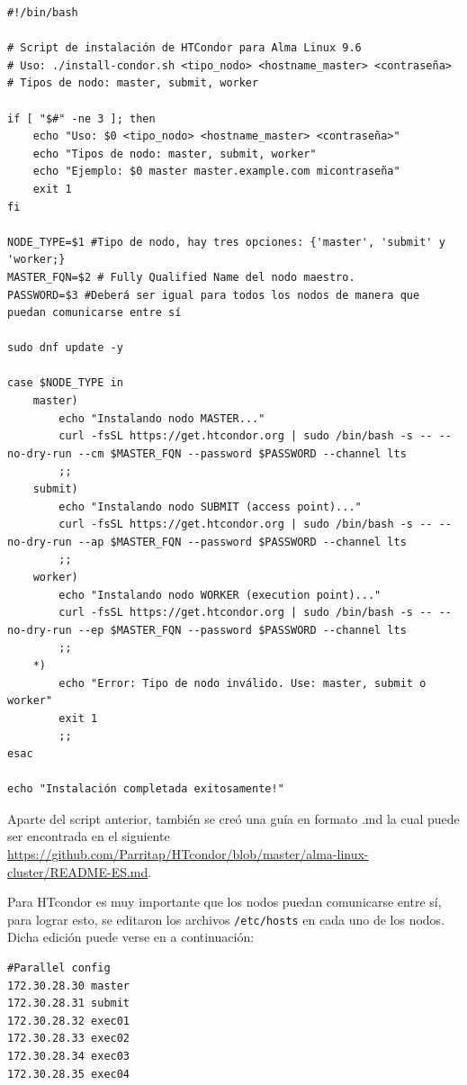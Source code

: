 \begin{verbatim}
#!/bin/bash

# Script de instalación de HTCondor para Alma Linux 9.6
# Uso: ./install-condor.sh <tipo_nodo> <hostname_master> <contraseña>
# Tipos de nodo: master, submit, worker

if [ "$#" -ne 3 ]; then
    echo "Uso: $0 <tipo_nodo> <hostname_master> <contraseña>"
    echo "Tipos de nodo: master, submit, worker"
    echo "Ejemplo: $0 master master.example.com micontraseña"
    exit 1
fi

NODE_TYPE=$1 #Tipo de nodo, hay tres opciones: {'master', 'submit' y 'worker;}
MASTER_FQN=$2 # Fully Qualified Name del nodo maestro.
PASSWORD=$3 #Deberá ser igual para todos los nodos de manera que puedan comunicarse entre sí

sudo dnf update -y

case $NODE_TYPE in
    master)
        echo "Instalando nodo MASTER..."
        curl -fsSL https://get.htcondor.org | sudo /bin/bash -s -- --no-dry-run --cm $MASTER_FQN --password $PASSWORD --channel lts
        ;;
    submit)
        echo "Instalando nodo SUBMIT (access point)..."
        curl -fsSL https://get.htcondor.org | sudo /bin/bash -s -- --no-dry-run --ap $MASTER_FQN --password $PASSWORD --channel lts
        ;;
    worker)
        echo "Instalando nodo WORKER (execution point)..."
        curl -fsSL https://get.htcondor.org | sudo /bin/bash -s -- --no-dry-run --ep $MASTER_FQN --password $PASSWORD --channel lts
        ;;
    *)
        echo "Error: Tipo de nodo inválido. Use: master, submit o worker"
        exit 1
        ;;
esac

echo "Instalación completada exitosamente!"
\end{verbatim}


Aparte del script anterior, también se creó una guía en formato .md la cual puede ser encontrada en el siguiente \href{https://github.com/Parritap/HTcondor/blob/master/alma-linux-cluster/README-ES.md}{https://github.com/Parritap/HTcondor/blob/master/alma-linux-cluster/README-ES.md}.



Para HTcondor es muy importante que los nodos puedan comunicarse entre sí, para lograr esto, se editaron los archivos \texttt{/etc/hosts} en cada uno de los nodos. Dicha edición puede verse en a continuación:

\begin{verbatim}
#Parallel config
172.30.28.30 master
172.30.28.31 submit
172.30.28.32 exec01
172.30.28.33 exec02
172.30.28.34 exec03
172.30.28.35 exec04
\end{verbatim}

